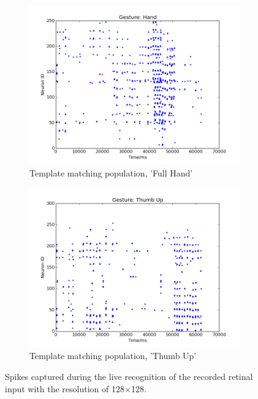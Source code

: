 \documentclass[journal]{journal}
\begin{document}
\begin{figure}
\begin{subfigure}[t]{0.24\textwidth}
		\includegraphics[width=\textwidth]{pics/figure_4.png}
		\caption{Template matching population, 'Full Hand'}
	    \label{fig:rec5}
	\end{subfigure}	
	\begin{subfigure}[t]{0.24\textwidth}
		\includegraphics[width=\textwidth]{pics/figure_5.png}
		\caption{Template matching population, 'Thumb Up'}
	    \label{fig:rect}
	\end{subfigure}	
\caption{Spikes captured during the live recognition of the recorded retinal input with the resolution of 128$\times$128. }
\label{fig:rps}
\end{figure}
\end{document}
